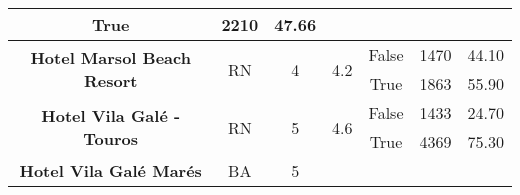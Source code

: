 \begin{table}[]
{\begin{tabular}{|c|c|c|c|c|r|r|}
			True                                                            &
			2210                                                            &
			47.66                                                             \\ \hline
			\multirow{2}{*}{\textbf{Hotel Marsol Beach Resort}}             &
			\multirow{2}{*}{RN}                                             &
			\multirow{2}{*}{4}                                              &
			\multirow{2}{*}{4.2}                                            &
			False                                                           &
			1470                                                            &
			44.10                                                             \\ \cline{5-7}
			                                                                &
			                                                                &
			                                                                &
			                                                                &
			True                                                            &
			1863                                                            &
			55.90                                                             \\ \hline
			\multirow{2}{*}{\textbf{Hotel Vila Galé - Touros}}              &
			\multirow{2}{*}{RN}                                             &
			\multirow{2}{*}{5}                                              &
			\multirow{2}{*}{4.6}                                            &
			False                                                           &
			1433                                                            &
			24.70                                                             \\ \cline{5-7}
			                                                                &
			                                                                &
			                                                                &
			                                                                &
			True                                                            &
			4369                                                            &
			75.30                                                             \\ \hline
			\multirow{2}{*}{\textbf{Hotel Vila Galé Marés}}                 &
			\multirow{2}{*}{BA}                                             &
			\multirow{2}{*}{5}                                              &

\end{tabular}}
\end{table}
